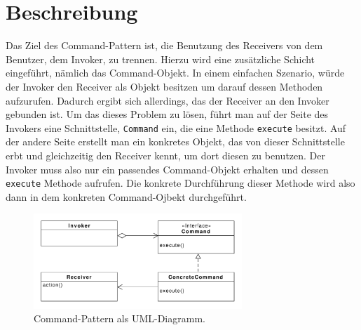 \section{Beschreibung}

Das Ziel des Command-Pattern ist, die Benutzung des Receivers von dem Benutzer, dem Invoker, zu trennen. Hierzu wird eine zusätzliche Schicht eingeführt, nämlich das Command-Objekt. In einem einfachen Szenario, würde der Invoker den Receiver als Objekt besitzen um darauf dessen Methoden aufzurufen. Dadurch ergibt sich allerdings, das der Receiver an den Invoker gebunden ist. Um das dieses Problem zu lösen, führt man auf der Seite des Invokers eine Schnittstelle, \texttt{Command} ein, die eine Methode \texttt{execute} besitzt. Auf der andere Seite erstellt man ein konkretes Objekt, das von dieser Schnittstelle erbt und gleichzeitig den Receiver kennt, um dort diesen zu benutzen. Der Invoker muss also nur ein passendes Command-Objekt erhalten und  dessen \texttt{execute} Methode aufrufen. Die konkrete Durchführung dieser Methode wird also dann in dem konkreten Command-Ojbekt durchgeführt. 


\begin{figure}[htbp]
\centering
\includegraphics[width=0.7\textwidth]{./paper/command/command}
\caption{Command-Pattern als UML-Diagramm.}
\label{commanddiagram}
\end{figure} 